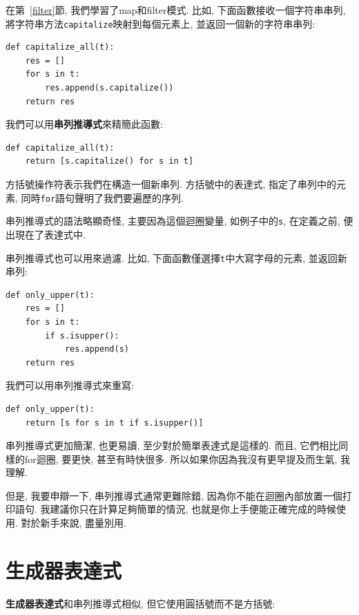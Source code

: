 \documentclass[10pt]{book}
\begin{document}
在第~\ref{filter}節, 我們學習了map和filter模式. 
比如, 下面函數接收一個字符串串列, 將字符串方法{\tt capitalize}映射到每個元素上, 
並返回一個新的字符串串列:

\begin{verbatim}
def capitalize_all(t):
    res = []
    for s in t:
        res.append(s.capitalize())
    return res
\end{verbatim}

我們可以用{\bf 串列推導式}來精簡此函數:

\begin{verbatim}
def capitalize_all(t):
    return [s.capitalize() for s in t]
\end{verbatim}

方括號操作符表示我們在構造一個新串列. 
方括號中的表達式, 指定了串列中的元素, 同時{\tt for}語句聲明了我們要遍歷的序列. 

串列推導式的語法略顯奇怪, 主要因為這個迴圈變量, 如例子中的{\tt s}, 在定義之前, 
便出現在了表達式中. 

串列推導式也可以用來過濾. 
比如, 下面函數僅選擇{\tt t}中大寫字母的元素, 並返回新串列:

\begin{verbatim}
def only_upper(t):
    res = []
    for s in t:
        if s.isupper():
            res.append(s)
    return res
\end{verbatim}

我們可以用串列推導式來重寫:

\begin{verbatim}
def only_upper(t):
    return [s for s in t if s.isupper()]
\end{verbatim}

串列推導式更加簡潔, 也更易讀, 至少對於簡單表達式是這樣的. 
而且, 它們相比同樣的for迴圈, 要更快, 甚至有時快很多. 
所以如果你因為我沒有更早提及而生氣, 我理解. 

但是, 我要申辯一下, 串列推導式通常更難除錯, 
因為你不能在迴圈內部放置一個打印語句. 
我建議你只在計算足夠簡單的情況, 也就是你上手便能正確完成的時候使用. 
對於新手來說, 盡量別用. 



\section{生成器表達式}

{\bf 生成器表達式}和串列推導式相似, 但它使用圓括號而不是方括號:
\end{document}
